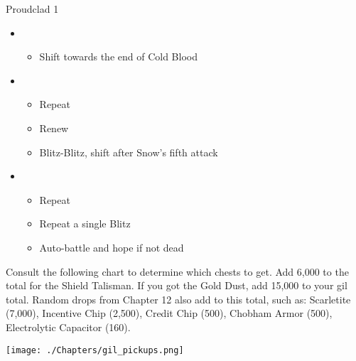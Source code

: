 \begin{battle}[1:31]{Proudclad 1}
\begin{itemize}
\begin{itemize}
		      \end{itemize}
		\item \sixth
		      \begin{itemize}
			      \item Shift towards the end of Cold Blood
		      \end{itemize}
		\item \first
		      \begin{itemize}
			      \item Repeat
			      \item Renew
			      \item Blitz-Blitz, shift after Snow's fifth attack
		      \end{itemize}
		\item \second
		      \begin{itemize}
			      \item Repeat
			      \item Repeat a single Blitz
			      \item Auto-battle and hope if not dead
		      \end{itemize}
	\end{itemize}
\end{battle}
	{  }
	{ 
	  {
	}
}


Consult the following chart to determine which chests to get. Add 6,000 to the total for the Shield Talisman. If you got the Gold Dust, add 15,000 to your gil total. Random drops from Chapter 12 also add to this total, such as: Scarletite (7,000), Incentive Chip (2,500), Credit Chip (500), Chobham Armor (500), Electrolytic Capacitor (160).

\begingroup
\texttt{[image: ./Chapters/gil\_pickups.png]}
\endgroup

